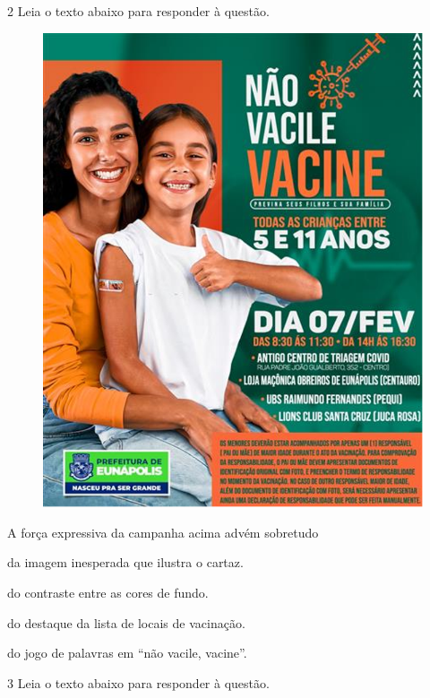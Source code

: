 \pagebreak

\num{2} Leia o texto abaixo para responder à questão. 


\begin{figure}[H]
\centering\includegraphics[width=.5\textwidth]{imgSAEB_7_POR/media/image24.png}
\end{figure}



A força expressiva da campanha acima advém sobretudo 

\begin{escolha}
    
    \item da imagem inesperada que ilustra o cartaz.
    
    \item do contraste entre as cores de fundo. 
    
    \item do destaque da lista de locais de vacinação. 
    
    \item do jogo de palavras em ``não vacile, vacine''.

\end{escolha}

\num{3} Leia o texto abaixo para responder à questão. 

